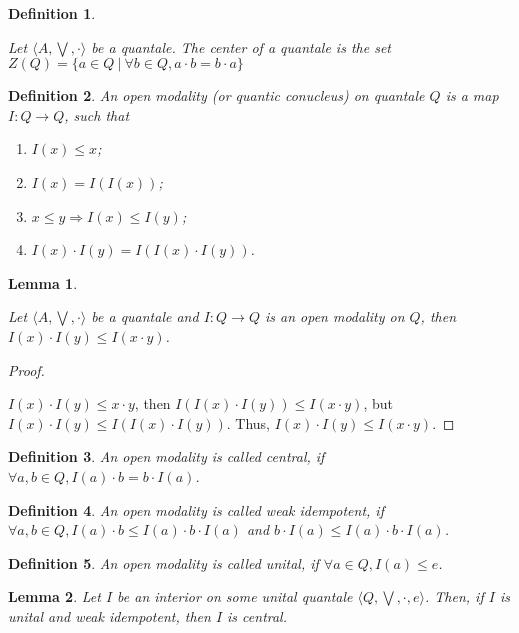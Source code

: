 \documentclass[a4paper]{article}
\newtheorem{lemma}{Lemma}
\newtheorem{defin}{Definition}
\begin{document}
\begin{defin}
$ $

  Let $\langle A, \bigvee, \cdot \rangle$ be a quantale. The center of a quantale is the set $Z(Q) = \{ a \in Q \: | \: \forall b \in Q, a \cdot b = b \cdot a \}$
\end{defin}

\begin{defin} An open modality (or quantic conucleus) on quantale $Q$ is a map $I : Q \to Q$, such that

\begin{enumerate}
  \item $I(x) \leq x$;
  \item $I(x) = I(I(x))$;
  \item $x \leq y \Rightarrow I(x) \leq I(y)$;
  \item $I(x) \cdot I(y) = I(I(x) \cdot I(y))$.
\end{enumerate}
\end{defin}

\begin{lemma}
$ $

  Let $\langle A, \bigvee, \cdot \rangle$ be a quantale and $I : Q \to Q$ is an open modality on $Q$, then
  $I(x) \cdot I(y) \leq I(x \cdot y)$.
\end{lemma}

\begin{proof}
$ $

  $I(x) \cdot I(y) \leq x \cdot y$, then $I(I(x) \cdot I(y)) \leq I(x \cdot y)$, but
$I(x) \cdot I(y) \leq I(I(x) \cdot I(y))$. Thus, $I(x) \cdot I(y) \leq I(x \cdot y)$.
\end{proof}

\begin{defin}
  An open modality is called central, if $\forall a, b \in Q, I(a) \cdot b = b \cdot I(a)$.
\end{defin}

\begin{defin}
  An open modality is called weak idempotent, if $\forall a, b \in Q, I(a) \cdot b \leq I(a) \cdot b \cdot I(a)$ and
  $b \cdot I(a) \leq I(a) \cdot b \cdot I(a)$.
\end{defin}

\begin{defin}
  An open modality is called unital, if $\forall a \in Q, I(a) \leq e$.
\end{defin}

\begin{lemma}
  Let $I$ be an interior on some unital quantale $\langle Q, \bigvee, \cdot, e \rangle$.
  Then, if $I$ is unital and weak idempotent, then $I$ is central.
\end{lemma}
\end{document}
